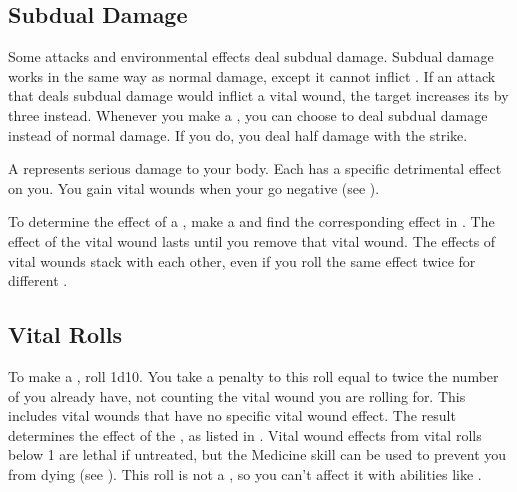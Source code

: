   \subsection{Subdual Damage}\label{Subdual Damage}
    Some attacks and environmental effects deal subdual damage.
    Subdual damage works in the same way as normal damage, except it cannot inflict .
    If an attack that deals subdual damage would inflict a vital wound, the target increases its  by three instead.
    Whenever you make a , you can choose to deal subdual damage instead of normal damage.
    If you do, you deal half damage with the strike.


  A  represents serious damage to your body.
  Each  has a specific detrimental effect on you.
  You gain vital wounds when your  go negative (see ).

  To determine the effect of a , make a  and find the corresponding effect in .
  The effect of the vital wound lasts until you remove that vital wound.
  The effects of vital wounds stack with each other, even if you roll the same effect twice for different .

  \subsection{Vital Rolls}\label{Vital Rolls}
    To make a , roll 1d10.
    You take a penalty to this roll equal to twice the number of  you already have, not counting the vital wound you are rolling for.
    This includes vital wounds that have no specific vital wound effect.
    The result determines the effect of the , as listed in .
    Vital wound effects from vital rolls below 1 are lethal if untreated, but the Medicine skill can be used to prevent you from dying (see ).
    This roll is not a , so you can't affect it with abilities like .

